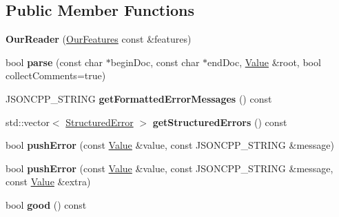 \subsection*{Public Member Functions}
\begin{DoxyCompactItemize}
\item 
\mbox{\label{classJson_1_1OurReader_a48a850914b9c8d7781be172930c478e5}} 
{\bfseries Our\+Reader} (\hyperlink{classJson_1_1OurFeatures}{Our\+Features} const \&features)
\item 
\mbox{\label{classJson_1_1OurReader_aba4f8749aab7f02ec17f107e392caf80}} 
bool {\bfseries parse} (const char $\ast$begin\+Doc, const char $\ast$end\+Doc, \hyperlink{classJson_1_1Value}{Value} \&root, bool collect\+Comments=true)
\item 
\mbox{\label{classJson_1_1OurReader_a7971de51d73bb4aee5b0c4742c4aaaac}} 
J\+S\+O\+N\+C\+P\+P\+\_\+\+S\+T\+R\+I\+NG {\bfseries get\+Formatted\+Error\+Messages} () const
\item 
\mbox{\label{classJson_1_1OurReader_a0eb2420a6bef89a3f3256191e6e3de6d}} 
std\+::vector$<$ \hyperlink{structJson_1_1OurReader_1_1StructuredError}{Structured\+Error} $>$ {\bfseries get\+Structured\+Errors} () const
\item 
\mbox{\label{classJson_1_1OurReader_a700e9d8e0977fa7e0375d26690d7025f}} 
bool {\bfseries push\+Error} (const \hyperlink{classJson_1_1Value}{Value} \&value, const J\+S\+O\+N\+C\+P\+P\+\_\+\+S\+T\+R\+I\+NG \&message)
\item 
\mbox{\label{classJson_1_1OurReader_addccecfca74b79adaad6115ddd614477}} 
bool {\bfseries push\+Error} (const \hyperlink{classJson_1_1Value}{Value} \&value, const J\+S\+O\+N\+C\+P\+P\+\_\+\+S\+T\+R\+I\+NG \&message, const \hyperlink{classJson_1_1Value}{Value} \&extra)
\item 
\mbox{\label{classJson_1_1OurReader_a63c7d874fa379397e0a5fa65f0843845}} 
bool {\bfseries good} () const
\end{DoxyCompactItemize}
